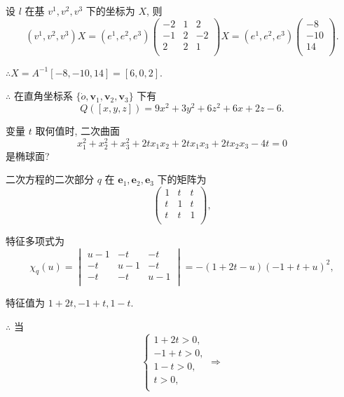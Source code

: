 \documentclass[color=black,device=normal,lang=cn,mode=geye]{elegantnote}
\begin{document}
\begin{solution}
    设 $l$ 在基 $v^1,v^2,v^3$ 下的坐标为 $X$, 则
    \[(v^1,v^2,v^3)X=(e^1,e^2,e^3)\begin{pmatrix}
        -2 & 1 & 2  \\
        -1 & 2 & -2 \\
        2  & 2 & 1  \\
    \end{pmatrix}X=(e^1,e^2,e^3)\begin{pmatrix}
        -8 \\
        -10 \\
        14 \\
    \end{pmatrix}.\]

    $\therefore X=A^{-1}[-8,-10,14]=[6,0,2]$.

    $\therefore$ 在直角坐标系 $\{\dot{o},\boldsymbol{v}_1,\boldsymbol{v}_2,\boldsymbol{v}_3\}$ 下有
    \[Q([x,y,z])=9x^2+3y^2+6z^2+6x+2z-6.\]
\end{solution}
\begin{exercise}%
    变量 $t$ 取何值时, 二次曲面
    \[x_1^2+x_2^2+x_3^2+2tx_1x_2+2tx_1x_3+2tx_2x_3-4t=0\]
    是椭球面?
\end{exercise}
\begin{solution}
    二次方程的二次部分 $q$ 在 $\boldsymbol{e}_1,\boldsymbol{e}_2,\boldsymbol{e}_3$ 下的矩阵为
    \[\begin{pmatrix}
        1 & t & t \\
        t & 1 & t \\
        t & t & 1 \\
    \end{pmatrix},\]

    特征多项式为
    \[\chi_q(u)=\begin{vmatrix}
        u-1 & -t & -t \\
        -t & u-1 & -t \\
        -t & -t & u-1 \\
    \end{vmatrix}=-(1+2t-u)(-1+t+u)^2,\]

    特征值为 $1+2t,-1+t,1-t$.

    $\therefore$ 当
    \[\begin{cases}
        1+2t>0, \\
        -1+t>0, \\
        1-t>0, \\
        t>0, \\
    \end{cases}\Rightarrow\]
\end{solution}
\end{document}
